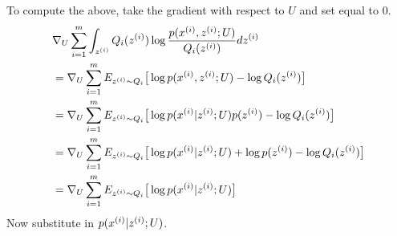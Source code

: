 \documentclass[11pt]{article}
\begin{document}
To compute the above, take the gradient with respect to $U$ and set equal to $0$.
\begin{align*}
    &\nabla_U \sum_{i=1}^m \int_{z^{(i)}} Q_i(z^{(i)}) \log \frac{p(x^{(i)},z^{(i)}; U)}{Q_i(z^{(i)})} d z^{(i)} \\
    &= \nabla_U \sum_{i=1}^m E_{z^{(i)} \sim Q_i}\big[ \log p(x^{(i)},z^{(i)}; U) - \log Q_i(z^{(i)}) \big] \\
    &= \nabla_U \sum_{i=1}^m E_{z^{(i)} \sim Q_i}\big[ \log p(x^{(i)}|z^{(i)}; U) p(z^{(i)}) - \log Q_i(z^{(i)}) \big] \\
    &= \nabla_U \sum_{i=1}^m E_{z^{(i)} \sim Q_i}\big[ \log p(x^{(i)}|z^{(i)}; U) + \log p(z^{(i)}) - \log Q_i(z^{(i)}) \big] \\
    &= \nabla_U \sum_{i=1}^m E_{z^{(i)} \sim Q_i}\big[ \log p(x^{(i)}|z^{(i)}; U) \big] \\
\end{align*}
Now substitute in $p(x^{(i)}|z^{(i)}; U)$.
\end{document}
